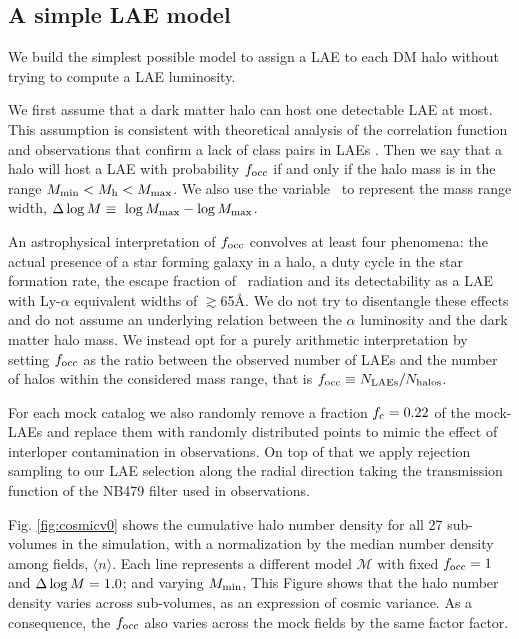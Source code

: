 \documentclass{emulateapj}
\newcommand{\ly}{{\ifmmode{{\rm Ly}\alpha}\else{Ly$\alpha$}\fi}}
\newcommand{\mmin}{{\ifmmode{{M_{\rm min}}}\else{${M_{\rm min}}$}\fi}}
\newcommand{\mmax}{{\ifmmode{{M_{\rm max}}}\else{${M_{\rm max}}$}\fi}}
\newcommand{\dlm}{{\ifmmode{{\Delta \log M}}\else{$\Delta \log M$}\fi}}
\newcommand{\focc}{{\ifmmode{{f_{\rm occ}}}\else{${f_{\rm occ}}$}\fi}}
\begin{document}
\subsection{A simple LAE model}
\label{subsec:mocks}

We build the simplest possible model to assign a LAE to each DM halo
without trying to compute a LAE luminosity.

We first assume that a dark matter halo can host one detectable LAE at
most.   
This assumption is consistent with theoretical analysis of the
correlation function \citep{Jose2013b} and observations that confirm a
lack of  class pairs in LAEs \citep{Bond2009}.  
Then we say that a halo will host a LAE with probability $\focc$
if and only if the halo mass is in the range $\mmin < M_{\mathrm
  h} < \mmax$. 
We also use the variable \dlm\ to represent the mass range width,
$\dlm\equiv\ \log \mmax - \log \mmax$.  


An astrophysical interpretation of $f_{\rm occ}$ convolves at least
four phenomena: the actual presence of a star forming galaxy in a
halo, a duty cycle in the star formation rate, the escape fraction of
\ly\ radiation and its detectability as a LAE with Ly-$\alpha$ equivalent widths of $\gtrsim$65\AA.   
We do not try to disentangle these effects and do not assume an underlying relation between the
$\alpha$ luminosity and the dark matter halo mass.
We instead opt for a purely arithmetic interpretation by setting
$\focc$ as the ratio between the observed number of LAEs and the
number of halos within the considered mass range, that is $\focc \equiv N_{\rm
  LAEs}/N_{\mathrm{halos}}$.   

For each mock catalog we also randomly remove a fraction $f_{\rm c}=0.22$  of the mock-LAEs and replace 
them with randomly distributed points to mimic the effect of interloper
contamination   in \citet{Bielby16} observations. 
On top of that we apply rejection sampling  to our LAE selection 
along the radial direction taking the transmission function of the
NB479 filter used in \citet{Bielby16} observations. 



Fig. \ref{fig:cosmicv0}  shows the cumulative halo number density
for all 27 sub-volumes in the simulation, with a normalization by the
median number density among fields, $\langle n \rangle$. 
Each line represents a different model $\mathcal{M}$ with fixed
$\focc=1$ and $\dlm=1.0$; and varying $\mmin$, 
This Figure shows that the halo number  density varies across
sub-volumes, as an expression of cosmic variance. 
As a consequence, the $\focc$ also varies across the mock fields  
by the same factor factor. 
\end{document}
